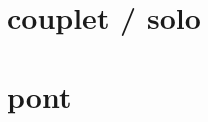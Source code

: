 \songbooksongstruct

\newpage
\begin{multicols}{2}
	\songlyrics
\end{multicols}
\newpage

\section*{couplet / solo}

\section*{pont}
